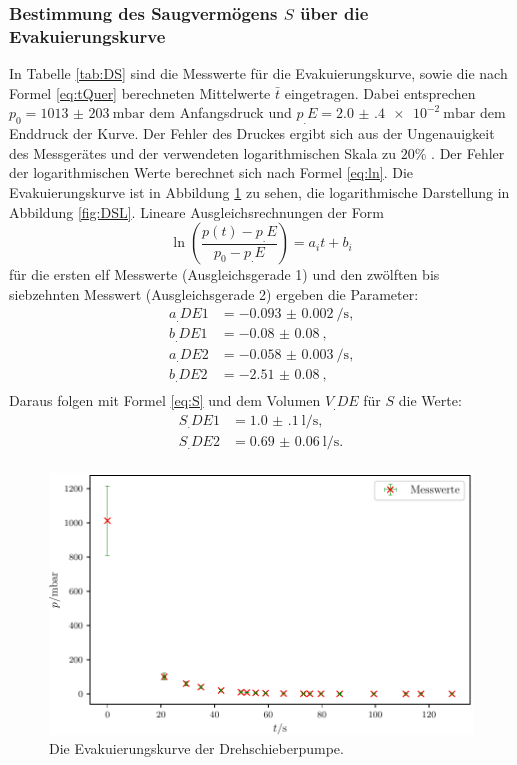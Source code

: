 \subsubsection{Bestimmung des Saugvermögens $S$ über die Evakuierungskurve}

In Tabelle \ref{tab:DS} sind die Messwerte für die Evakuierungskurve, sowie die nach Formel \eqref{eq:tQuer} berechneten Mittelwerte $\bar{t}$ eingetragen.
Dabei entsprechen $p_0=\SI{1013(203)}{\milli\bar}$ dem Anfangsdruck und $p_.E=\SI{2.0(4)e-2}{\milli\bar}$ dem Enddruck der Kurve. Der Fehler des Druckes ergibt sich aus der Ungenauigkeit des Messgerätes und der verwendeten logarithmischen Skala zu $20\%$ \cite{V70}. 
Der Fehler der logarithmischen Werte berechnet sich nach Formel \eqref{eq:ln}.
Die Evakuierungskurve ist in Abbildung \ref{fig:DSE} zu sehen, die logarithmische Darstellung in Abbildung \ref{fig:DSL}.
Lineare Ausgleichsrechnungen der Form
\[
\ln\left(\frac{p(t)-p_.E}{p_0-p_.E}\right) = a_it+b_i
\]
für die ersten elf Messwerte (Ausgleichsgerade 1) und den zwölften bis siebzehnten Messwert (Ausgleichsgerade 2) ergeben die Parameter:
\begin{align*}
a_.{DE1} &= \SI{-0.093(2)}{\per\second} \text{,}\\
b_.{DE1} &= \SI{-0.08(8)}{} \text{,}\\
a_.{DE2} &= \SI{-0.058(3)}{\per\second} \text{,}\\
b_.{DE2} &= \SI{-2.51(8)}{} \text{,}\\
\end{align*} 
Daraus folgen mit Formel \eqref{eq:S} und dem Volumen $V_.{DE}$ für $S$ die Werte:
\begin{align*}
S_.{DE1} &= \SI{1.0(1)}{\litre\per\second} \text{,}\\
S_.{DE2} &= \SI{0.69(6)}{\litre\per\second} \text{.}\\
\end{align*}

\begin{figure}
\centering
\includegraphics[width=\linewidth-70pt,height=\textheight-70pt,keepaspectratio]{content/images/DSE.pdf}
\caption{Die Evakuierungskurve der Drehschieberpumpe.}
\label{fig:DSE}
\end{figure}

